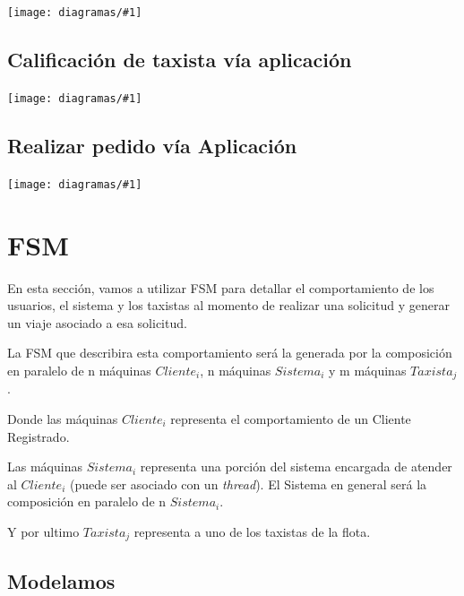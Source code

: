\documentclass[a4paper, 10pt, twoside]{article}
\newcommand{\diagramav}[1]{%
  \texttt{[image: diagramas/\#1]}%
}
\begin{document}
\diagramav{da-logueo-de-usuario}


\subsection{Calificación de taxista vía aplicación}
\label{sec:calificacion-aplicacion}

\diagramav{da-calificar-taxista}


\subsection{Realizar pedido vía Aplicación}
\label{sec:pedido-aplicacion}

\diagramav{da-realizar-pedido-aplicacion}


\section{FSM}

En esta sección, vamos a utilizar FSM para detallar el comportamiento de los usuarios, el sistema y los taxistas al momento de realizar una solicitud y generar un viaje asociado a esa solicitud.

La FSM que describira esta comportamiento ser\'a la generada por la composici\'on en paralelo de n m\'aquinas $Cliente_i$, n m\'aquinas $Sistema_i$ y m m\'aquinas $Taxista_j$.

Donde las m\'aquinas $Cliente_i$ representa el comportamiento de un Cliente Registrado.

Las m\'aquinas $Sistema_i$ representa una porci\'on del sistema encargada de atender al $Cliente_i$ (puede ser asociado con un \emph{thread}). El Sistema en general ser\'a la composici\'on en paralelo de n $Sistema_i$.

Y por ultimo $Taxista_j$ representa a uno de los taxistas de la flota.

\subsection{Modelamos}
\end{document}
